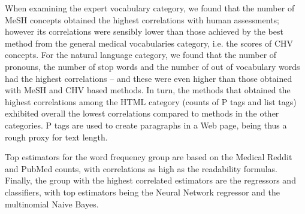 When examining the expert vocabulary category, we found that the number of MeSH concepts obtained the highest correlations with human assessments; however its correlations were sensibly lower than those achieved by the best method from the general medical vocabularies category, i.e. the scores of CHV concepts. For the natural language category, we found that the number of pronouns, the number of stop words and the number of out of vocabulary words had the highest correlations -- and these were even higher than those obtained with MeSH and CHV based methods. In turn, the methods that obtained the highest correlations among the HTML category (counts of P tags and list tags) exhibited overall the lowest correlations compared to methods in the other categories. P tags are used to create paragraphs in a Web page, being thus a rough proxy for text length. 





Top estimators for the word frequency group are based on the Medical Reddit and PubMed counts, with correlations as high as the readability formulas.
Finally, the group with the highest correlated estimators are the regressors and classifiers, with top estimators being the Neural Network regressor and the multinomial Naive Bayes.
%

%


